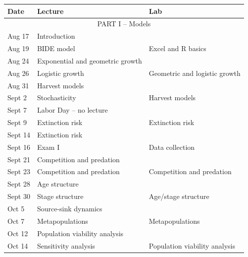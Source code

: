 \documentclass[12pt]{article}
\begin{document}
\begin{center}
\begin{tabular}[c]{lll}
\hline \hline
{\bf Date} & {\bf Lecture}                      & {\bf Lab}                     \\
\hline
           \multicolumn{3}{c}{PART I -- Models}                                 \\
\hline
\hline
Aug 17     & Introduction                       &                               \\
Aug 19     & BIDE model                         & Excel and R basics            \\
\hline
Aug 24     & Exponential and geometric growth   &                               \\
Aug 26     & Logistic growth                    & Geometric and logistic growth \\
\hline
Aug 31     & Harvest models                     &                               \\
Sept 2     & Stochasticity                      & Harvest models                \\
\hline
Sept 7     & Labor Day -- no lecture            &                               \\
Sept 9     & Extinction risk                    & Extinction risk               \\
\hline
Sept 14    & Extinction risk                    &                               \\
Sept 16    & Exam I                             & Data collection               \\
\hline
Sept 21    & Competition and predation          &                               \\
Sept 23    & Competition and predation          & Competition and predation     \\
\hline
Sept 28    & Age structure                      &                               \\
Sept 30    & Stage structure                    & Age/stage structure           \\
\hline
Oct 5      & Source-sink dynamics               &                               \\
Oct 7      & Metapopulations                    & Metapopulations               \\
\hline
Oct 12     & Population viability analysis      &                               \\
Oct 14     & Sensitivity analysis               & Population viability analysis \\

\end{tabular}
\end{center}
\end{document}
